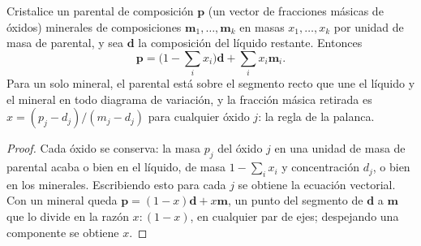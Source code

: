 \begin{proposition}\label{prop:b2:magmatic-differentiation:lever}
Cristalice un  parental de composición $\mathbf p$ (un vector de fracciones másicas de óxidos)
minerales de composiciones $\mathbf m_1, \dots, \mathbf m_k$ en masas
$x_1, \dots, x_k$ por unidad de masa de  parental, y sea $\mathbf d$ la composición
del líquido restante. Entonces
\[
\mathbf p = \Big(1 - \sum_i x_i\Big)\mathbf d + \sum_i x_i \mathbf m_i .
\]
Para un solo mineral, el  parental está sobre el segmento recto que une el líquido y el
mineral en todo diagrama de variación, y la fracción másica retirada es
$x = (p_j - d_j)/(m_j - d_j)$ para cualquier óxido $j$: la regla de la palanca.
\end{proposition}

\begin{proof}
Cada óxido se conserva: la masa $p_j$ del óxido $j$ en una unidad de masa de  parental acaba
o bien en el líquido, de masa $1 - \sum_i x_i$ y concentración $d_j$, o bien en los
minerales. Escribiendo esto para cada $j$ se obtiene la ecuación vectorial. Con un mineral
queda $\mathbf p = (1-x)\mathbf d + x\mathbf m$, un punto del segmento de
$\mathbf d$ a $\mathbf m$ que lo divide en la razón $x : (1-x)$, en cualquier par de
ejes; despejando una componente se obtiene $x$.
\end{proof}


